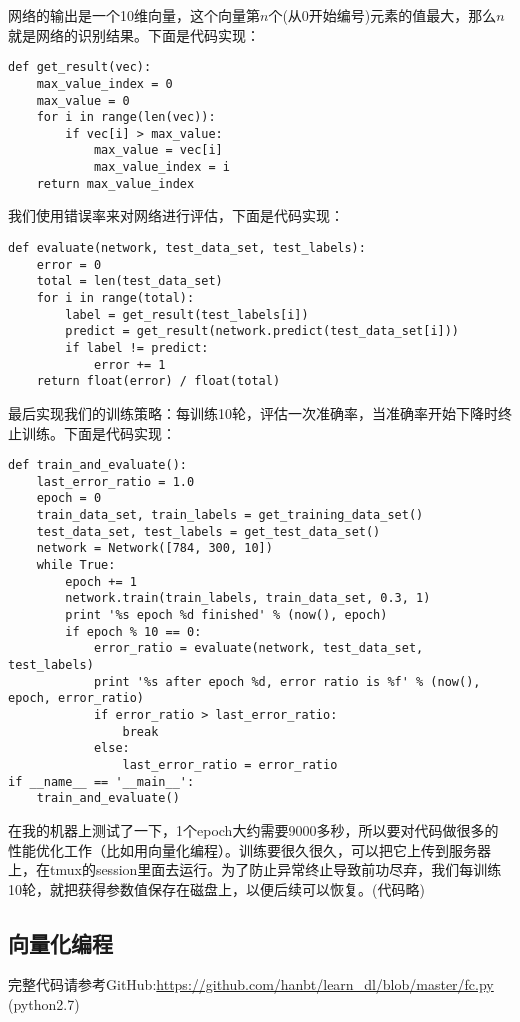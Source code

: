 网络的输出是一个10维向量，这个向量第\(n\)个(从0开始编号)元素的值最大，那么\(n\)就是网络的识别结果。下面是代码实现：
\begin{lstlisting}
def get_result(vec):
    max_value_index = 0
    max_value = 0
    for i in range(len(vec)):
        if vec[i] > max_value:
            max_value = vec[i]
            max_value_index = i
    return max_value_index
\end{lstlisting}

我们使用错误率来对网络进行评估，下面是代码实现：
\begin{lstlisting}
def evaluate(network, test_data_set, test_labels):
    error = 0
    total = len(test_data_set)
    for i in range(total):
        label = get_result(test_labels[i])
        predict = get_result(network.predict(test_data_set[i]))
        if label != predict:
            error += 1
    return float(error) / float(total)
\end{lstlisting}

最后实现我们的训练策略：每训练10轮，评估一次准确率，当准确率开始下降时终止训练。下面是代码实现：
\begin{lstlisting}
def train_and_evaluate():
    last_error_ratio = 1.0
    epoch = 0
    train_data_set, train_labels = get_training_data_set()
    test_data_set, test_labels = get_test_data_set()
    network = Network([784, 300, 10])
    while True:
        epoch += 1
        network.train(train_labels, train_data_set, 0.3, 1)
        print '%s epoch %d finished' % (now(), epoch)
        if epoch % 10 == 0:
            error_ratio = evaluate(network, test_data_set, test_labels)
            print '%s after epoch %d, error ratio is %f' % (now(), epoch, error_ratio)
            if error_ratio > last_error_ratio:
                break
            else:
                last_error_ratio = error_ratio
if __name__ == '__main__':
    train_and_evaluate()
\end{lstlisting}

在我的机器上测试了一下，1个epoch大约需要9000多秒，所以要对代码做很多的性能优化工作（比如用向量化编程）。训练要很久很久，可以把它上传到服务器上，在tmux的session里面去运行。为了防止异常终止导致前功尽弃，我们每训练10轮，就把获得参数值保存在磁盘上，以便后续可以恢复。(代码略)

\subsection{向量化编程}\label{Bp:13}

\begin{note}
	完整代码请参考GitHub:\url{https://github.com/hanbt/learn_dl/blob/master/fc.py} (python2.7)
\end{note}

